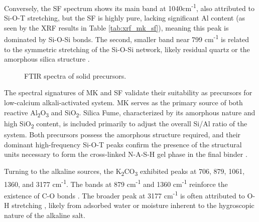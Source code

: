 Conversely, the SF spectrum shows its main band at 1040cm\textsuperscript{-1}, also attributed to Si-O-T stretching, but the SF is highly pure, lacking significant Al content (as seen by the XRF results in Table \ref{tab:xrf_mk_sf}), meaning this peak is dominated by Si-O-Si bonds.
The second, smaller band near 799 cm\textsuperscript{-1} is related to the symmetric stretching of the Si-O-Si network, likely residual quartz or the amorphous silica structure \cite{ma2022calcium}.

\begin{figure}[H]
    \centering
    \caption{FTIR spectra of solid precursors.}
    \label{fig:ftir_precursors}
\end{figure}

The spectral signatures of MK and SF validate their suitability as precursors for low-calcium alkali-activated system. MK serves as the primary source of both reactive Al\textsubscript{2}O\textsubscript{3} and SiO\textsubscript{2}.
Silica Fume, characterized by its amorphous nature and high SiO\textsubscript{2} content, is included primarily to adjust the overall Si/Al ratio of the system.
Both precursors possess the amorphous structure required, and their dominant high-frequency Si-O-T peaks confirm the presence of the structural units necessary to form the cross-linked N-A-S-H gel phase in the final binder \cite{Provis2014_LowCa}.

 Turning to the alkaline sources, the K\textsubscript{2}CO\textsubscript{3} exhibited peaks at 706, 879, 1061, 1360, and 3177 cm\textsuperscript{-1}.
 The bands at 879 cm\textsuperscript{-1} and 1360 cm\textsuperscript{-1} reinforce the existence of C-O bonds \cite{moraes2024scsa}.
 The broader peak at 3177 cm\textsuperscript{-1} is often attributed to O-H stretching \cite{Brito2008}, likely from adsorbed water or moisture inherent to the hygroscopic nature of the alkaline salt.
 
